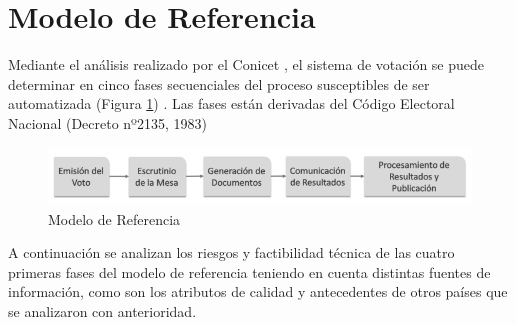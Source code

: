 \section{Modelo de Referencia}
Mediante el análisis realizado por el Conicet \cite{conicet}, el sistema de votación se puede determinar en cinco fases secuenciales del proceso susceptibles de ser automatizada (Figura \ref{graf:modeloReferencia}) . Las fases están derivadas del Código Electoral Nacional (Decreto nº2135, 1983) \cite{decreto}

\begin{figure}[h!]
    \begin{center}
        \includegraphics[width=\textwidth]{img/modeloReferencia.png}
    \end{center}
  \caption{Modelo de Referencia}
  \label{graf:modeloReferencia}
\end{figure}

A continuación se analizan los riesgos y factibilidad técnica de las cuatro primeras fases del modelo de referencia teniendo en cuenta distintas fuentes de información, como son los atributos de calidad y antecedentes de otros países que se analizaron con anterioridad. 

